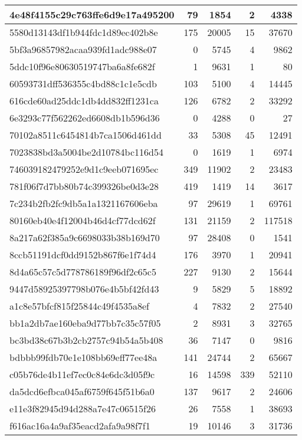 \documentclass[]{article}
\begin{document}
\begin{table}[t]
\begin{tabular}{l|r|r|r|r}
\hline
4e48f4155c29c763ffe6d9e17a495200 & 79 & 1854 & 2 & 4338\\
\hline
5580d13143df1b944fdc1d89ec402b8e & 175 & 20005 & 15 & 37670\\
\hline
5bf3a96857982acaa939fd1adc988e07 & 0 & 5745 & 4 & 9862\\
\hline
5ddc10f96e80630519747ba6a8fe682f & 1 & 9631 & 1 & 80\\
\hline
60593731dff536355c4bd88c1c1e5cdb & 103 & 5100 & 4 & 14445\\
\hline
616cde60ad25ddc1db4dd832ff1231ca & 126 & 6782 & 2 & 33292\\
\hline
6e3293c77f562262ed6608db1b596d36 & 0 & 4288 & 0 & 27\\
\hline
70102a8511c6454814b7ca1506d461dd & 33 & 5308 & 45 & 12491\\
\hline
7023838bd3a5004be2d10784bc116d54 & 0 & 1619 & 1 & 6974\\
\hline
746039182479252e9d1c9eeb071695ec & 349 & 11902 & 2 & 23483\\
\hline
781f06f7d7bb80b74c399326be0d3e28 & 419 & 1419 & 14 & 3617\\
\hline
7c234b2fb2fc9db5a1a1321167606eba & 97 & 29619 & 1 & 69761\\
\hline
80160eb40e4f12004b46d4cf77dcd62f & 131 & 21159 & 2 & 117518\\
\hline
8a217a62f385a9c6698033b38b169d70 & 97 & 28408 & 0 & 1541\\
\hline
8ccb51191dcf0dd9152b867f6e1f74d4 & 176 & 3970 & 1 & 20941\\
\hline
8d4a65c57c5d778786189f96df2c65c5 & 227 & 9130 & 2 & 15644\\
\hline
9447d58925397798b076e4b5bf42fd43 & 9 & 5829 & 5 & 18892\\
\hline
a1c8e57bfcf815f25844c49f4535a8ef & 4 & 7832 & 2 & 27540\\
\hline
bb1a2db7ae160eba9d77bb7c35c57f05 & 2 & 8931 & 3 & 32765\\
\hline
bc3bd38c67b3b2cb2757c94b54a5b408 & 36 & 7147 & 0 & 9816\\
\hline
bdbbb99fdb70e1e108bb69eff77ee48a & 141 & 24744 & 2 & 65667\\
\hline
c05b76de4b11ef7ec0c84e6dc3d05f9c & 16 & 14598 & 339 & 52110\\
\hline
da5dcd6efbca045af6759f645f51b6a0 & 137 & 9617 & 2 & 24606\\
\hline
e11e3f82945d94d288a7e47c06515f26 & 26 & 7558 & 1 & 38693\\
\hline
f616ac16a4a9af35eacd2afa9a98f7f1 & 19 & 10146 & 3 & 31736\\

\end{tabular}
\end{table}
\end{document}
